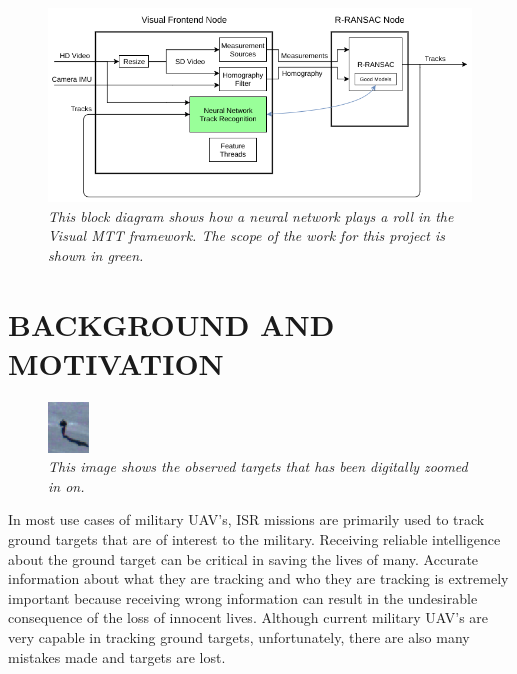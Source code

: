 \documentclass[letterpaper, 10 pt, conference]{ieeeconf}  %
\begin{document}
\begin{figure}
	\begin{center}
		\includegraphics[width=.85\textwidth]{rransac.png}
		\caption{\textit{This block diagram shows how a neural network plays a roll in the Visual MTT framework. The scope of the work for this project is shown in green.}} 
		\label{fig:rransac}
	\end{center}
\end{figure}

\section{BACKGROUND AND MOTIVATION} \label{BACKGROUND}

\begin{figure}
	\begin{center}
		\includegraphics[width=.45\textwidth]{gimbal_zoomed.png}
		\caption{\textit{This image shows the observed targets that has been digitally zoomed in on.}} 
		\label{fig:gimbal_zoomed}
	\end{center}
\end{figure}


In most use cases of military UAV's, ISR missions are primarily used to track ground targets that are of interest to the military. Receiving reliable intelligence about the ground target can be critical in saving the lives of many. Accurate information about what they are tracking and who they are tracking is extremely important because receiving wrong information can result in the undesirable consequence of the loss of innocent lives. Although current military UAV's are very capable in tracking ground targets, unfortunately, there are also many mistakes made and targets are lost. 
\end{document}
